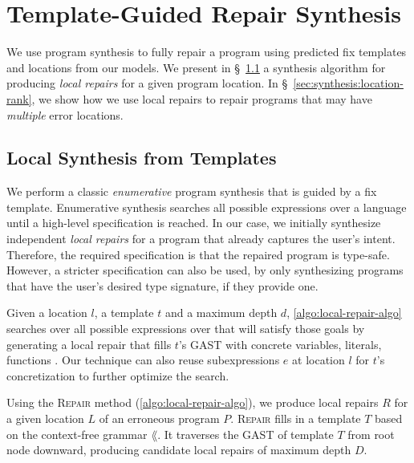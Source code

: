 \section{Template-Guided Repair Synthesis}
\label{sec:synthesis}
We use program synthesis to fully repair a program using predicted fix templates
and locations from our models. We present in
\S~\ref{sec:synthesis:local-synthesis} a synthesis algorithm for producing
\emph{local repairs} for a given program location. In
\S~\ref{sec:synthesis:location-rank}, we show how we use local repairs to
repair programs that may have \emph{multiple} error locations.

\lstMakeShortInline[mathescape=true]{|}

\subsection{Local Synthesis from Templates}
\label{sec:synthesis:local-synthesis}

We perform a classic \emph{enumerative} program synthesis that is guided by a
fix template. Enumerative synthesis searches all possible expressions over a
language until a high-level specification is reached. In our case, we initially
synthesize independent \emph{local repairs} for a program that already captures
the user's intent. Therefore, the required specification is that the repaired
program is type-safe. However, a stricter specification can also be used, by
only synthesizing programs that have the user's desired type signature, if
they provide one.

Given a location $l$, a template $t$ and a maximum depth $d$,
\autoref{algo:local-repair-algo} searches over all possible expressions over
\lang that will satisfy those goals by generating a local repair that fills
$t$'s GAST with concrete variables, literals, functions \etc. Our technique can
also reuse subexpressions $e$ at location $l$ for $t$'s concretization to
further optimize the search.



Using the \textsc{Repair} method (\autoref{algo:local-repair-algo}), we produce
local repairs $R$ for a given location $L$ of an erroneous program $P$.
\textsc{Repair} fills in a template $T$ based on the context-free grammar
$\lang$. It traverses the GAST of template $T$ from root node
downward, producing candidate local repairs of maximum depth $D$.

